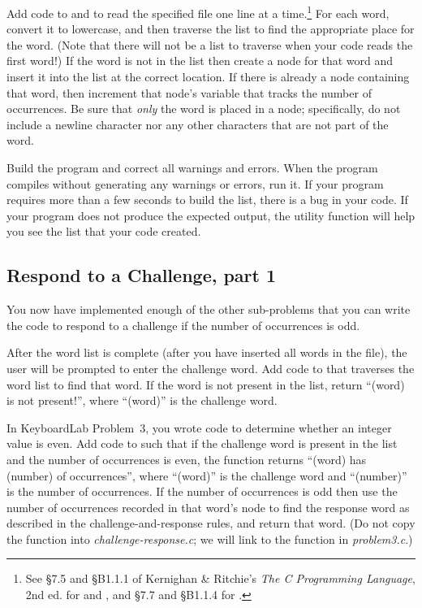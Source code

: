 

Add code to  and  to read the
specified file one line at a time.\footnote{See \S7.5 and \S{}B1.1.1 of
Kernighan \& Ritchie's \textit{The C Programming Language}, 2nd ed. for
 and , and \S7.7 and \S{}B1.1.4 for
.} For each word, convert it to lowercase, and then traverse
the list to find the appropriate place for the word. (Note that there will not
be a list to traverse when your code reads the first word!) If the word is not
in the list then create a node for that word and insert it into the list at the
correct location. If there is already a node containing that word, then
increment that node's variable that tracks the number of occurrences. Be sure
that \textit{only} the word is placed in a node; specifically, do not include a
newline character nor any other characters that are not part of the word.

Build the program and correct all warnings and errors. When the program
compiles without generating any warnings or errors, run it. If your program
requires more than a few seconds to build the list, there is a bug in your
code. If your program does not produce the expected output, the
 utility function will help you see the list that your
code created.

\subsection{Respond to a Challenge, part 1}

You now have implemented enough of the other sub-problems that you can write the
code to respond to a challenge if the number of occurrences is odd.



After the word list is complete (after you have inserted all words in the
file), the user will be prompted to enter the challenge word. Add code to
 that traverses the word list to find that word. If the word
is not present in the list, return ``(word) is not present!'', where ``(word)''
is the challenge word.

In KeyboardLab Problem~3, you wrote code to determine whether an integer value
is even. Add code to  such that if the challenge word is
present in the list and the number of occurrences is even, the function returns
``(word) has (number) of occurrences'', where ``(word)'' is the challenge word
and ``(number)'' is the number of occurrences. If the number of occurrences is
odd then use the number of occurrences recorded in that word's node to find the
response word as described in the challenge-and-response rules, and return that
word. (Do not copy the  function into
\textit{challenge-response.c}; we will link to the function in
\textit{problem3.c}.)

